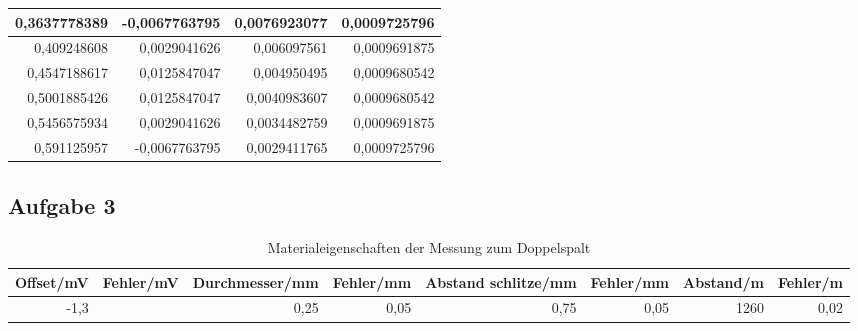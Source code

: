\documentclass[12pt]{scrartcl}
\begin{document}
\begin{table}[htbp]
\begin{center}
\begin{tabular}{|r|r|r|r|}
0,3637778389 & -0,0067763795 & 0,0076923077 & 0,0009725796 \\ \hline
0,409248608 & 0,0029041626 & 0,006097561 & 0,0009691875 \\ \hline
0,4547188617 & 0,0125847047 & 0,004950495 & 0,0009680542 \\ \hline
0,5001885426 & 0,0125847047 & 0,0040983607 & 0,0009680542 \\ \hline
0,5456575934 & 0,0029041626 & 0,0034482759 & 0,0009691875 \\ \hline
0,591125957 & -0,0067763795 & 0,0029411765 & 0,0009725796 \\ \hline
\end{tabular}
\end{center}
\label{tab:a_2_m}
\end{table}

\subsection{Aufgabe 3}

\begin{table}[htbp]
\caption{Materialeigenschaften der Messung zum Doppelspalt}
\begin{center}
\begin{tabular}{|l|l|l|l|l|l|l|l|}
\hline
Offset/mV & Fehler/mV & Durchmesser/mm & Fehler/mm & Abstand schlitze/mm & Fehler/mm & Abstand/m & Fehler/m \\ \hline
\multicolumn{1}{|r|}{-1,3} &  & \multicolumn{1}{r|}{0,25} & \multicolumn{1}{r|}{0,05} & \multicolumn{1}{r|}{0,75} & \multicolumn{1}{r|}{0,05} & \multicolumn{1}{r|}{1260} & \multicolumn{1}{r|}{0,02} \\ \hline
\end{tabular}
\end{center}
\label{tab:a_3_e}
\end{table}
\end{document}
